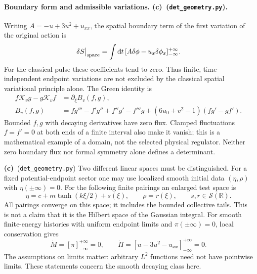 \documentclass[11pt,a4paper]{article}
\newcommand{\Lc}{\textbf{(c)}}
\newcommand{\G}{\texttt{det\_geometry.py}}
\newcommand{\dd}{\mathrm d}
\newcommand{\R}{\mathbb R}
\begin{document}
\paragraph{Boundary form and admissible variations. \Lc\ (\G).}
Writing $A=-u+3u^2+u_{xx}$, the spatial boundary term of the first variation
of the original action is
\begin{equation}
 \delta S\big|_{\rm space}=\int\dd t\,[A\delta\phi-u_x\delta\phi_x]_{-\infty}^{+\infty}.
 \label{eq:variation}
\end{equation}
For the classical pulse these coefficients tend to zero. Thus finite,
time-independent endpoint variations are not excluded by the classical
spatial variational principle alone. The Green identity is
\begin{align}
 f\mathcal K_vg-g\mathcal K_vf&=\partial_\xi B_v(f,g),\\
 B_v(f,g)&=fg'''-f'g''+f''g'-f'''g
       +(6u_0+v^2-1)(fg'-gf').\label{eq:green}
\end{align}
Bounded $f,g$ with decaying derivatives have zero flux. Clamped fluctuations
$f=f'=0$ at both ends of a finite interval also make it vanish; this is a
mathematical example of a domain, not the selected physical regulator.
Neither zero boundary flux nor formal symmetry alone defines a determinant.

\Lc\ (\G) Two different linear spaces must be distinguished. For a fixed
potential-endpoint sector one may use localized smooth initial data
$(\eta,\rho)$ with $\eta(\pm\infty)=0$. For the following finite pairings an
enlarged test space is
\begin{equation}
 \eta=c+m\tanh(k\xi/2)+s(\xi),\qquad
 \rho=r(\xi),\qquad s,r\in\mathcal S(\R).
 \label{eq:testspace}
\end{equation}
All pairings converge on this space; it includes the bounded collective tails.
This is not a claim that it is the Hilbert space of the Gaussian integral.
For smooth finite-energy histories with uniform endpoint limits and
$\pi(\pm\infty)=0$, local conservation gives
\begin{equation}
 \dot M=[\pi]_{-\infty}^{+\infty}=0,\qquad
 \dot\Pi=[u-3u^2-u_{xx}]_{-\infty}^{+\infty}=0.\label{eq:charges}
\end{equation}
The assumptions on limits matter: arbitrary $L^2$ functions need not have
pointwise limits. These statements concern the smooth decaying class here.
\end{document}
